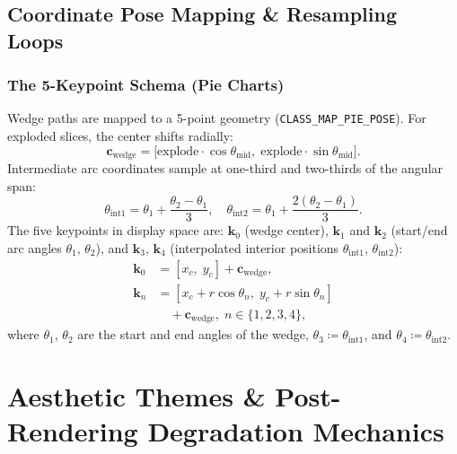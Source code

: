 \documentclass[11pt,twocolumn]{article}
\begin{document}
\subsection{Coordinate Pose Mapping \& Resampling Loops}\label{sec:pose}

\subsubsection{The 5-Keypoint Schema (Pie Charts)}\label{sec:5kpt}

Wedge paths are mapped to a 5-point geometry (\texttt{CLASS\_MAP\_PIE\_POSE}). For exploded slices, the center shifts radially:
\begin{equation}\label{eq:wedge_center}
  \mathbf{c}_{\text{wedge}} = \bigl[\text{explode}\cdot\cos\theta_{\text{mid}},\;\text{explode}\cdot\sin\theta_{\text{mid}}\bigr].
\end{equation}
Intermediate arc coordinates sample at one-third and two-thirds of the angular span:
\begin{equation}\label{eq:arc_interp}
  \theta_{\text{int1}} = \theta_1 + \frac{\theta_2-\theta_1}{3},\quad \theta_{\text{int2}} = \theta_1 + \frac{2(\theta_2-\theta_1)}{3}.
\end{equation}
The five keypoints in display space are: $\mathbf{k}_0$ (wedge center), $\mathbf{k}_1$ and $\mathbf{k}_2$ (start/end arc angles $\theta_1$, $\theta_2$), and $\mathbf{k}_3$, $\mathbf{k}_4$ (interpolated interior positions $\theta_{\text{int1}}$, $\theta_{\text{int2}}$):
\begin{align}
  \mathbf{k}_0 &= [x_c,\; y_c] + \mathbf{c}_{\text{wedge}}, \label{eq:k0}\\
  \mathbf{k}_n &= [x_c + r\cos\theta_n,\; y_c + r\sin\theta_n] \nonumber\\
  &\quad + \mathbf{c}_{\text{wedge}},\; n \in \{1,2,3,4\}, \label{eq:kn}
\end{align}
where $\theta_1$, $\theta_2$ are the start and end angles of the wedge, $\theta_3 \coloneqq \theta_{\text{int1}}$, and $\theta_4 \coloneqq \theta_{\text{int2}} $.

\section{Aesthetic Themes \& Post-Rendering Degradation Mechanics}\label{sec:themes}
\end{document}
